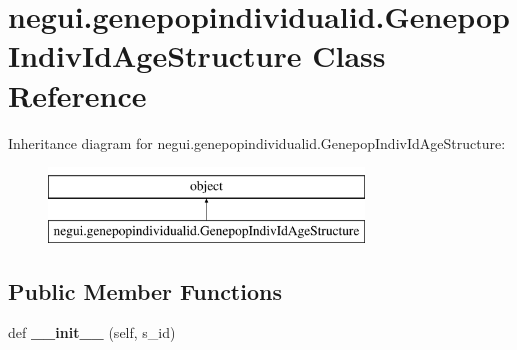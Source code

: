 \hypertarget{classnegui_1_1genepopindividualid_1_1GenepopIndivIdAgeStructure}{}\section{negui.\+genepopindividualid.\+Genepop\+Indiv\+Id\+Age\+Structure Class Reference}
\label{classnegui_1_1genepopindividualid_1_1GenepopIndivIdAgeStructure}
Inheritance diagram for negui.\+genepopindividualid.\+Genepop\+Indiv\+Id\+Age\+Structure\+:\begin{figure}[H]
\begin{center}
\leavevmode
\includegraphics[height=2.000000cm]{classnegui_1_1genepopindividualid_1_1GenepopIndivIdAgeStructure}
\end{center}
\end{figure}
\subsection*{Public Member Functions}
\begin{DoxyCompactItemize}
\item 
def {\bfseries \+\_\+\+\_\+init\+\_\+\+\_\+} (self, s\+\_\+id)\hypertarget{classnegui_1_1genepopindividualid_1_1GenepopIndivIdAgeStructure_a9135a344dc50b0452eca7b226d7bd0fd}{}\label{classnegui_1_1genepopindividualid_1_1GenepopIndivIdAgeStructure_a9135a344dc50b0452eca7b226d7bd0fd}

\end{DoxyCompactItemize}
